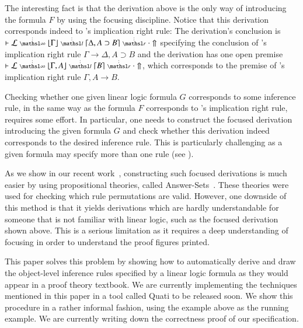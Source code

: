 \documentclass{ebl}
\newcommand\lra{\longrightarrow}
\begin{document}
The interesting fact is that the derivation above is the only way of
introducing the formula $F$ by using the focusing discipline. Notice that this
derivation corresponds indeed to \mLJ's implication right rule: The derivation's
conclusion is $\llfDash \lEnc \ndots{\infty} \lft{\Gamma} \ndots{l}
{\rght{\Delta, A \supset B}} \ndots{r} \cdot \Uparrow$ specifying the conclusion
of \mLJ's implication right rule $\Gamma \lra \Delta, A \supset B$ and the
derivation has one open premise $\llfDash \lEnc \ndots{\infty} \lft{\Gamma, A}
\ndots{l} \rght{B} \ndots{r} \cdot \Uparrow$, which corresponds to the premise
of \mLJ's implication right rule $\Gamma, A \lra B$.

Checking whether one given linear logic formula $G$ corresponds to some
inference rule, in the same way as the formula $F$ corresponds to \mLJ's
implication right rule, requires some effort. In particular, one needs
to construct the focused derivation introducing the given formula $G$ and check whether this derivation indeed
corresponds to the desired inference rule. This is particularly challenging as a given formula may specify 
more than one rule (see \cite{nigam.jlc}). 

As we show in our recent work~\cite{nigam13iclp}, constructing such focused derivations is 
much easier by using propositional theories, called Answer-Sets~\cite{gelfond90iclp}. These theories were used for
checking which rule permutations are valid. However, one downside of this method is that it 
yields derivations which are hardly understandable for someone that is not familiar with linear logic, 
such as the focused derivation shown above. This is a serious limitation as it requires
a deep understanding of focusing in order to understand the proof figures printed.

This paper solves this problem by showing how to automatically derive and draw
the object-level inference rules
specified by a linear logic formula as they would appear in a proof theory textbook. We are currently
implementing the techniques mentioned in this paper in a tool called Quati to be released soon.
We show this procedure in a rather informal fashion, using the example above as
the running example. 
We are currently writing down the correctness proof of our specification.

\end{document}
